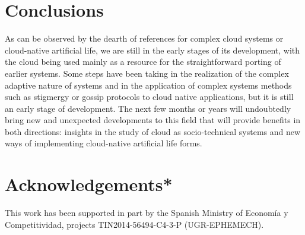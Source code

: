 \documentclass[utf8]{frontiersSCNS} %
\begin{document}
\section{Conclusions}

As can be observed by the dearth of references for complex cloud
systems or cloud-native artificial life, we are still in the early
stages of its development, with the cloud being used mainly as a
resource for the straightforward porting of earlier systems. Some
steps have been taking in the realization of the complex adaptive
nature of systems and in the application of complex systems methods
such as stigmergy or gossip protocols to cloud native applications,
but it is still an early stage of development. The next few months or
years will undoubtedly bring new and unexpected developments to this
field that will provide benefits in both directions: insights in the
study of cloud as socio-technical systems and new ways of implementing
cloud-native artificial life forms.

\section{Acknowledgements*}

This work has been supported in part by the Spanish Ministry of Economía y Competitividad, projects TIN2014-56494-C4-3-P (UGR-EPHEMECH).



\end{document}
